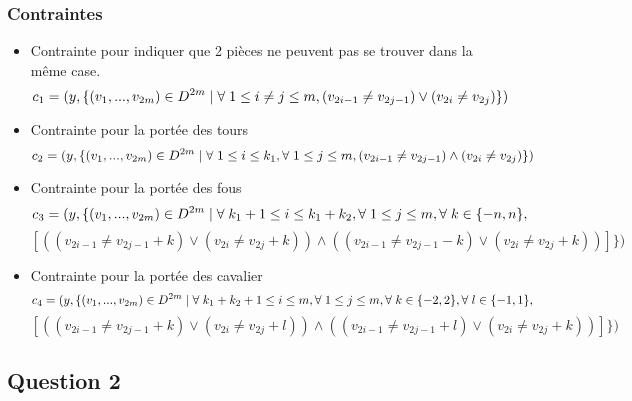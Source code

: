 \documentclass[a4paper,11pt]{article}
\begin{document}
\subsubsection{Contraintes}
\begin{itemize}
\item Contrainte pour indiquer que 2 pièces ne peuvent pas se trouver dans la même case.
   $$c_{1} = ( y, \{ (v_{1}, ..., v_{2m}) \in  D^{2m} \mid \forall \hspace{0.1cm}  1\leq i \neq j \leq m, (v_{2i-1} \neq v_{2j-1}) \vee  (v_{2i} \neq v_{2j}) \} ) $$
\item Contrainte pour la portée des tours 
 $$ c_{2} = ( y, \{ (v_{1}, ..., v_{2m}) \in  D^{2m} \mid \forall \hspace{0.1cm} 1\leq i \leq k_{1}, \forall \hspace{0.1cm} 1\leq j \leq m, (v_{2i-1} \neq v_{2j-1}) \wedge  (v_{2i} \neq v_{2j}) \} ) $$

\item Contrainte pour la portée des fous 
  $$c_{3} = ( y, \{ (v_{1}, ..., v_{2m}) \in  D^{2m} \mid \forall \hspace{0.1cm}  k_{1}+1\leq i \leq k_{1}+k_{2}, \forall \hspace{0.1cm} 1\leq j \leq m, \forall \hspace{0.1cm} k \in \{-n, n \}, $$
  $$[ ((v_{2i-1} \neq v_{2j-1}+k) \vee  (v_{2i} \neq v_{2j}+k)) \wedge  ((v_{2i-1} \neq v_{2j-1}-k) \vee  (v_{2i} \neq v_{2j}+k)) ] \})$$

\item Contrainte pour la portée des cavalier 
  $$ c_{4} = ( y, \{ (v_{1}, ..., v_{2m}) \in  D^{2m} \mid \forall \hspace{0.1cm} k_{1}+k_{2}+1\leq i \leq m, \forall \hspace{0.1cm} 1\leq j \leq m, \forall \hspace{0.1cm} k \in \{-2, 2\}, \forall \hspace{0.1cm}l \in \{-1, 1\}, $$
  $$[((v_{2i-1} \neq v_{2j-1}+k) \vee  (v_{2i} \neq v_{2j}+l)) \wedge ((v_{2i-1} \neq v_{2j-1}+l) \vee  (v_{2i} \neq v_{2j}+k)) ] \})$$

\end{itemize}

\newpage 
\subsection{Question 2}
\end{document}
